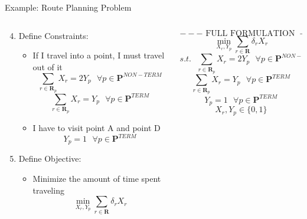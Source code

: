 \documentclass[10pt, aspectratio=169]{beamer}
\begin{document}
\begin{frame}[t]{Example: Route Planning Problem}
    \vspace{-0.2cm}
    \begin{columns}[t]
        \begin{column}[t]{0.5\textwidth}
            \begin{enumerate}
                \setcounter{enumi}{3}
                \item Define Constraints:
                \begin{itemize}
                    \item If I travel into a point, I must travel out of it 
                    $$\sum_{r \in \textbf{R}_p} X_r = 2 Y_p \ \ \ \forall p \in \textbf{P}^{NON-TERM}$$
                    $$\sum_{r \in \textbf{R}_p} X_r = Y_p \ \ \ \forall p \in \textbf{P}^{TERM}$$

                    \item I have to visit point A and point D
                    $$Y_p = 1 \ \ \ \forall p \in \textbf{P}^{TERM}$$
                \end{itemize}
                \item Define Objective:
                \begin{itemize}
                    \item Minimize the amount of time spent traveling
                    $$\min_{X_r,Y_p} \sum_{r \in \textbf{R}} \delta_r X_r$$
                \end{itemize}
            \end{enumerate}
        \end{column}
        \begin{column}[t]{0.5\textwidth}
            $$---\text{ FULL FORMULATION }---$$
            $$\min_{X_r,Y_p} \sum_{r \in \textbf{R}} \delta_r X_r$$
            $$s.t.\ \ \ \sum_{r \in \textbf{R}_p} X_r = 2 Y_p \ \ \ \forall p \in \textbf{P}^{NON-TERM}$$
            $$\sum_{r \in \textbf{R}_p} X_r = Y_p \ \ \ \forall p \in \textbf{P}^{TERM}$$
            $$Y_p = 1 \ \ \ \forall p \in \textbf{P}^{TERM}$$
            $$X_r, Y_p \in \{0,1\}$$

        \end{column}
    \end{columns}
\end{frame}
\end{document}
